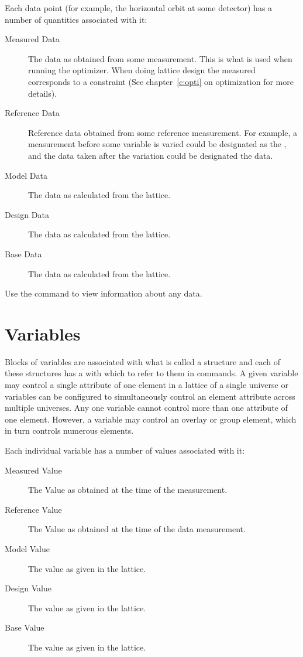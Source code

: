 Each data point (for example, the horizontal orbit at some
detector) has a number of quantities associated with it:
  \vspace*{-3ex}
  \begin{description}
  \item[Measured Data] \Newline 
The data as obtained from some measurement. This is what is used when running the optimizer.
When doing lattice design the measured  corresponds to
a constraint (See chapter~\ref{c:opti} on optimization for more details).
  \item[Reference Data] \Newline
Reference data obtained from some reference measurement. For example,
a measurement before some variable is varied could be designated as
the , and the data taken after the variation could be 
designated the  data.
  \item[Model Data] \Newline
The data as calculated from the  lattice.
  \item[Design Data] \Newline
The data as calculated from the  lattice.
  \item[Base Data] \Newline
The data as calculated from the  lattice.
  \end{description}

Use the  command to view information about any data.

\vfill
\break
\section{Variables}

Blocks of variables are associated with what is called a
 structure and each of these structures has a 
with which to refer to them in \tao commands. A given variable may
control a single attribute of one element in a  lattice
of a single universe or variables can be configured to simultaneously
control an element attribute across multiple universes. Any one variable 
cannot control more than one attribute of one element. However, a variable
may control an overlay or group element, which in turn controls numerous elements.

Each individual variable has a number of values associated with it:
  \vspace*{-3ex}
  \begin{description}
  \item[Measured Value] \Newline
The Value as obtained at the time of the  measurement.
  \item[Reference Value] \Newline
The Value as obtained at the time of the  data  measurement.
  \item[Model Value] \Newline
The value as given in the  lattice.
  \item[Design Value] \Newline
The value as given in the  lattice.
  \item[Base Value] \Newline
The value as given in the  lattice.
  \end{description}


